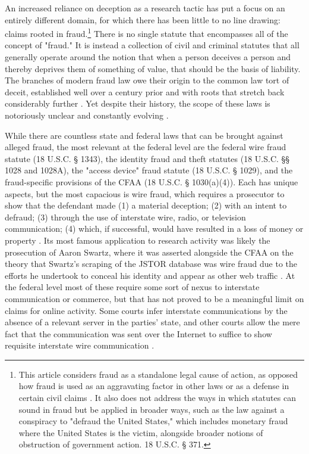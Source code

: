 An increased reliance on deception as a research tactic has put a focus on an entirely different domain, for which there has been little to no line drawing: claims rooted in fraud.\footnote{This article considers fraud as a standalone legal cause of action, as opposed how fraud is used as an aggravating factor in other laws or as a defense in certain civil claims \cite{podgor_criminal_1999}. It also does not address the ways in which statutes can sound in fraud but be applied in broader ways, such as the law against a conspiracy to "defraud the United States," which includes monetary fraud where the United States is the victim, alongside broader notions of obstruction of government action. 18 U.S.C. § 371.} There is no single statute that encompasses all of the concept of "fraud." It is instead a collection of civil and criminal statutes that all generally operate around the notion that when a person deceives a person and thereby deprives them of something of value, that should be the basis of liability. The branches of modern fraud law owe their origin to the common law tort of deceit, established well over a century prior and with roots that stretch back considerably further \cite{henricksen2021}. Yet despite their history, the scope of these laws is notoriously unclear and constantly evolving \cite{podgor_criminal_1999}.

While there are countless state and federal laws that can be brought against alleged fraud, the most relevant at the federal level are the federal wire fraud statute (18 U.S.C. § 1343), the identity fraud and theft statutes (18 U.S.C. §§ 1028 and 1028A), the "access device" fraud statute (18 U.S.C. § 1029), and the fraud-specific provisions of the CFAA (18 U.S.C. § 1030(a)(4)). Each has unique aspects, but the most capacious is wire fraud, which requires a prosecutor to show that the defendant made (1) a material deception; (2) with an intent to defraud; (3) through the use of interstate wire, radio, or television communication; (4) which, if successful, would have resulted in a loss of money or property \cite{desantis2018}. Its most famous application to research activity was likely the prosecution of Aaron Swartz, where it was asserted alongside the CFAA on the theory that Swartz's scraping of the JSTOR database was wire fraud due to the efforts he undertook to conceal his identity and appear as other web traffic \cite{sellars_impact_2013}. At the federal level most of these require some sort of nexus to interstate communication or commerce, but that has not proved to be a meaningful limit on claims for online activity. Some courts infer interstate communications by the absence of a relevant server in the parties' state, and other courts allow the mere fact that the communication was sent over the Internet to suffice to show requisite interstate wire communication \cite{malkiel2023}.

